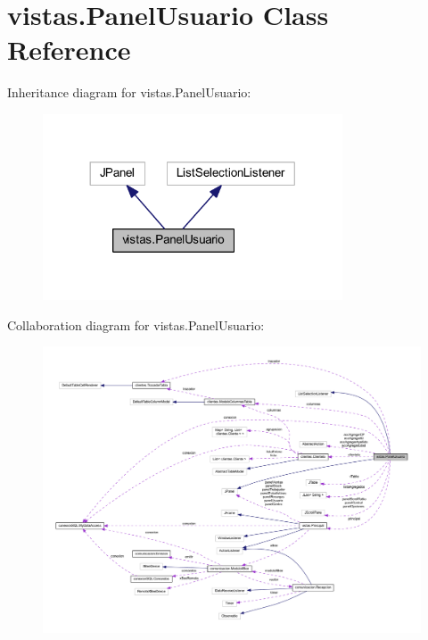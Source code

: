 \hypertarget{classvistas_1_1_panel_usuario}{}\section{vistas.\+Panel\+Usuario Class Reference}
\label{classvistas_1_1_panel_usuario}


Inheritance diagram for vistas.\+Panel\+Usuario\+:
\nopagebreak
\begin{figure}[H]
\begin{center}
\leavevmode
\includegraphics[width=252pt]{classvistas_1_1_panel_usuario__inherit__graph}
\end{center}
\end{figure}


Collaboration diagram for vistas.\+Panel\+Usuario\+:
\nopagebreak
\begin{figure}[H]
\begin{center}
\leavevmode
\includegraphics[width=350pt]{classvistas_1_1_panel_usuario__coll__graph}
\end{center}
\end{figure}
